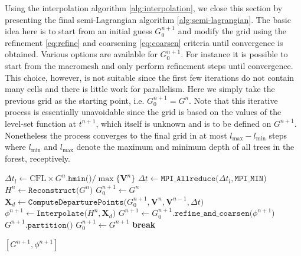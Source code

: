 Using the interpolation algorithm \ref{alg:interpolation}, we close this section by presenting the final semi-Lagrangian algorithm \ref{alg:semi-lagrangian}. The basic idea here is to start from an initial guess $G^{n+1}_0$ and modify the grid using the refinement \eqref{eq:refine} and coarsening \eqref{eq:coarsen} criteria until convergence is obtained. Various options are available for $G^{n+1}_0$. For instance it is possible to start from the macromesh and only perform refinement steps until convergence. This choice, however, is not suitable since the first few iterations do not contain many cells and there is little work for parallelism. Here we simply take the previous grid as the starting point, i.e. $G^{n+1}_0 = G^n$. Note that this iterative process is essentially unavoidable since the grid is based on the values of the level-set function at $t^{n+1}$, which itself is unknown and is to be defined on $G^{n+1}$. Nonetheless the process converges to the final grid in at most $l_{\max}-l_{\min}$ steps where $l_{\min}$ and $l_{\max}$ denote the maximum and minimum depth of all trees in the forest, receptively.
\begin{algorithm}[htbp]
\caption{$[G^{n+1}, \phi^{n+1}] \gets \texttt{SemiLagrangian (}G^n, \phi^n, \mathbf{V}^n, \mathbf{V}^{n-1}, \text{CFL}\texttt{)}$} %
\begin{algorithmic}[1]
\State $\Delta t_l \gets \text{CFL} \times G^n.\texttt{hmin()} / \max \{\mathbf{V}^n \} $
\State $\Delta t   \gets \texttt{MPI\_Allreduce(}\Delta t_l,\texttt{MPI\_MIN)}$
\State $H^n \gets \texttt{Reconstruct(} G^n\texttt{)}$ 
\State $G^{n+1}_0 \gets G^n$
	\State $\mathbf{X}_d  \gets \texttt{ComputeDeparturePoints(}G^{n+1}_0, \mathbf{V}^n, \mathbf{V}^{n-1}, \Delta t\texttt{)}$ 
	\State $\phi^{n+1} \gets \texttt{Interpolate(}H^n, \textbf{X}_d\texttt{)}$
	\State $G^{n+1} \gets G^{n+1}_0.\texttt{refine\_and\_coarsen(}\phi^{n+1}\texttt{)}$ 
		\State $G^{n+1}.\texttt{partition()}$
		\State $G^{n+1}_0 \gets G^{n+1}$
	\Else
		\State \textbf{break}
	\EndIf
\EndWhile

\State \Return $[G^{n+1}, \phi^{n+1}]$
\end{algorithmic}
\label{alg:semi-lagrangian}
\end{algorithm}

